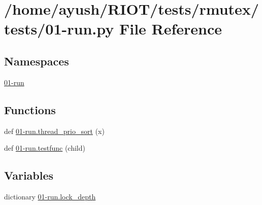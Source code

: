\hypertarget{rmutex_2tests_201-run_8py}{}\section{/home/ayush/\+R\+I\+O\+T/tests/rmutex/tests/01-\/run.py File Reference}
\label{rmutex_2tests_201-run_8py}
\subsection*{Namespaces}
\begin{DoxyCompactItemize}
\item 
 \hyperlink{namespace01-run}{01-\/run}
\end{DoxyCompactItemize}
\subsection*{Functions}
\begin{DoxyCompactItemize}
\item 
def \hyperlink{namespace01-run_a9a3d0f55b0b22faa1021654ea4bd5f66}{01-\/run.\+thread\+\_\+prio\+\_\+sort} (x)
\item 
def \hyperlink{namespace01-run_aff983ffd4ab0e6bf8e7e58970e4a10bb}{01-\/run.\+testfunc} (child)
\end{DoxyCompactItemize}
\subsection*{Variables}
\begin{DoxyCompactItemize}
\item 
dictionary \hyperlink{namespace01-run_a3e90d7ea68b49e97ae68ba6b5faa5132}{01-\/run.\+lock\+\_\+depth}
\end{DoxyCompactItemize}
